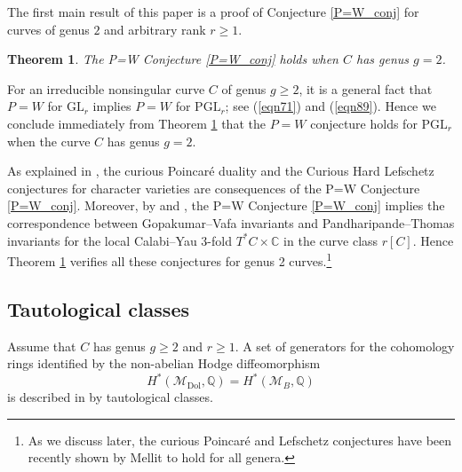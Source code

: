\documentclass[11pt]{amsart}
\theoremstyle{plain}
\newtheorem{thm}{Theorem}[section]
\theoremstyle{definition}
\theoremstyle{remark}
\newcommand{\BC}{{\mathbb{C}}}
\newcommand{\BQ}{{\mathbb{Q}}}
\newcommand{\CM}{{\mathcal M}}
\begin{document}
The first main result of this paper is a proof of Conjecture \ref{P=W_conj} for curves of genus $2$ and arbitrary rank $r\geq 1$.

\begin{thm}\label{genus_2}
The P=W
Conjecture \ref{P=W_conj} holds when $C$ has genus $g=2$.
\end{thm}

For an irreducible nonsingular curve $C$ of genus $g \geq 2$, it is a general fact that $P=W$ for $\mathrm{GL}_r$ implies $P=W$ for $\mathrm{PGL}_r$; see (\ref{eqn71}) and (\ref{eqn89}). Hence we conclude immediately from Theorem \ref{genus_2} that the $P=W$ conjecture holds for $\mathrm{PGL}_r$ when the curve $C$ has genus $g=2$.

As explained in \cite[Section 1]{dCHM1}, the curious Poincar\'e duality and the Curious Hard Lefschetz conjectures \cite[Conjectures 4.2.4 and 4.2.7]{HRV} for character varieties are consequences of the P=W Conjecture \ref{P=W_conj}.  Moreover, by \cite{CDP} and \cite[Section 9.3]{MT}, the P=W Conjecture \ref{P=W_conj} implies the correspondence between Gopakumar--Vafa invariants and Pandharipande--Thomas invariants \cite[Conjecture 3.13]{MT} for the local Calabi--Yau 3-fold $T^*C \times \BC$ in the curve class $r[C]$. Hence Theorem \ref{genus_2} verifies all these conjectures for genus 2 curves.\footnote{As we discuss later, the curious Poincar\'e and Lefschetz conjectures have been recently shown by Mellit \cite{Mellit} to hold for all genera.}



\subsection{Tautological classes}\label{sec_0.3}
Assume that $C$ has genus $g \geq 2$ and $r \geq 1$. A set of generators for the  cohomology rings identified by the non-abelian Hodge diffeomorphism
\begin{equation}\label{cohomology}
H^\ast(\CM_{\mathrm{Dol}}, \BQ) = H^\ast(\CM_B, \BQ) 
\end{equation}
is described in \cite{Markman} by tautological classes. 
\end{document}
